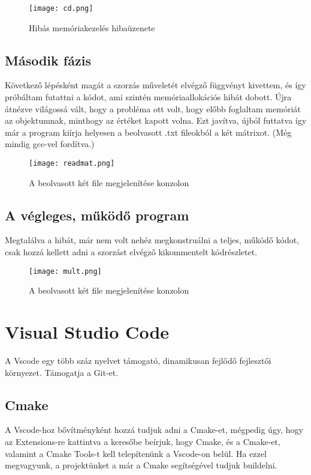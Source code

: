 \documentclass[a4paper, 12pt]{article}
\begin{document}
\begin{figure}[h!]
\begin{center}
\texttt{[image: cd.png]}
\caption*{Hibás memóriakezelés hibaüzenete}
\end{center}
\end{figure}


\subsection{Második fázis}
Következő lépésként magát a szorzás műveletét elvégző függvényt kivettem, és így próbáltam futattni a kódot, ami szintén memóriaallokációs hibát dobott. Újra átnézve világossá vált, hogy a probléma ott volt, hogy előbb foglaltam memóriát az objektumnak, minthogy az értéket kapott volna. Ezt javítva, újból futtatva így már a program kiírja helyesen a beolvasott .txt fileokból a két mátrixot. (Még mindig gcc-vel fordítva.) 

\begin{figure}[h!]
\begin{center}
\texttt{[image: readmat.png]}
\caption*{A beolvasott két file megjelenítése konzolon}
\end{center}
\end{figure}


\subsection{A végleges, működő program}

Megtalálva a hibát, már nem volt nehéz megkonstruálni a teljes, működő kódot, csak hozzá kellett adni a szorzást elvégző kikommentelt kódrészletet.

\begin{figure}[h!]
\begin{center}
\texttt{[image: mult.png]}
\caption*{A beolvasott két file megjelenítése konzolon}
\end{center}
\end{figure}

\newpage

\section{Visual Studio Code}

A Vscode egy több száz nyelvet támogató, dinamikusan fejlődő fejlesztői környezet. Támogatja a Git-et.
\subsection{Cmake}
A Vscode-hoz bővítményként hozzá tudjuk adni a Cmake-et, mégpedig úgy, hogy az Extensions-re kattintva a keresőbe beírjuk, hogy Cmake, és a Cmake-et, valamint a Cmake Tools-t kell telepítenünk a Vscode-on belül. Ha ezzel megvagyunk, a projektünket a már a Cmake segítségével tudjuk buildelni.
\end{document}
